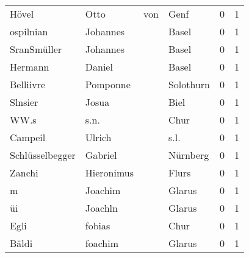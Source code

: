 \begin{center}
\begin{tiny}
\begin{longtabu}{llllrr}
                    Hövel &                               Otto &         von &                                        Genf &          0 &         1 \\
                ospilnian &                           Johannes &             &                                       Basel &          0 &         1 \\
              SranSmüller &                           Johannes &             &                                       Basel &          0 &         1 \\
                  Hermann &                             Daniel &             &                                       Basel &          0 &         1 \\
                Belliivre &                           Pomponne &             &                                   Solothurn &          0 &         1 \\
                  Slnsier &                              Josua &             &                                        Biel &          0 &         1 \\
                     WW.s &                               s.n. &             &                                        Chur &          0 &         1 \\
                  Campeil &                             Ulrich &             &                                        s.l. &          0 &         1 \\
          Schlüsselbegger &                            Gabriel &             &                                    Nürnberg &          0 &         1 \\
                   Zanchi &                         Hieronimus &             &                                       Flurs &          0 &         1 \\
                        m &                            Joachim &             &                                      Glarus &          0 &         1 \\
                       üi &                            Joachln &             &                                      Glarus &          0 &         1 \\
                     Egli &                             fobias &             &                                        Chur &          0 &         1 \\
                    Bäldi &                            foachim &             &                                      Glarus &          0 &         1 \\

\end{longtabu}
\end{tiny}
\end{center}
